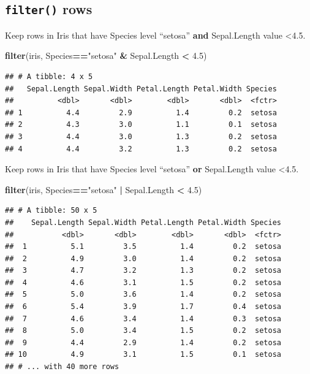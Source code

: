 \documentclass[]{book}
\newenvironment{Shaded}{\begin{snugshade}}{\end{snugshade}}
\newcommand{\KeywordTok}[1]{\textcolor[rgb]{0.13,0.29,0.53}{\textbf{#1}}}
\newcommand{\FloatTok}[1]{\textcolor[rgb]{0.00,0.00,0.81}{#1}}
\newcommand{\StringTok}[1]{\textcolor[rgb]{0.31,0.60,0.02}{#1}}
\newcommand{\OperatorTok}[1]{\textcolor[rgb]{0.81,0.36,0.00}{\textbf{#1}}}
\newcommand{\NormalTok}[1]{#1}
\begin{document}
\subsection{\texorpdfstring{\texttt{filter()}
rows}{filter() rows}}\label{filter-rows}

Keep rows in Iris that have Species level ``setosa'' \textbf{and}
Sepal.Length value \textless{}4.5.

\begin{Shaded}
\begin{Highlighting}[]
\KeywordTok{filter}\NormalTok{(iris, Species}\OperatorTok{==}\StringTok{"setosa"} \OperatorTok{&}\StringTok{ }\NormalTok{Sepal.Length }\OperatorTok{<}\StringTok{ }\FloatTok{4.5}\NormalTok{)}
\end{Highlighting}
\end{Shaded}

\begin{verbatim}
## # A tibble: 4 x 5
##   Sepal.Length Sepal.Width Petal.Length Petal.Width Species
##          <dbl>       <dbl>        <dbl>       <dbl>  <fctr>
## 1          4.4         2.9          1.4         0.2  setosa
## 2          4.3         3.0          1.1         0.1  setosa
## 3          4.4         3.0          1.3         0.2  setosa
## 4          4.4         3.2          1.3         0.2  setosa
\end{verbatim}

Keep rows in Iris that have Species level ``setosa'' \textbf{or}
Sepal.Length value \textless{}4.5.

\begin{Shaded}
\begin{Highlighting}[]
\KeywordTok{filter}\NormalTok{(iris, Species}\OperatorTok{==}\StringTok{"setosa"} \OperatorTok{|}\StringTok{ }\NormalTok{Sepal.Length }\OperatorTok{<}\StringTok{ }\FloatTok{4.5}\NormalTok{)}
\end{Highlighting}
\end{Shaded}

\begin{verbatim}
## # A tibble: 50 x 5
##    Sepal.Length Sepal.Width Petal.Length Petal.Width Species
##           <dbl>       <dbl>        <dbl>       <dbl>  <fctr>
##  1          5.1         3.5          1.4         0.2  setosa
##  2          4.9         3.0          1.4         0.2  setosa
##  3          4.7         3.2          1.3         0.2  setosa
##  4          4.6         3.1          1.5         0.2  setosa
##  5          5.0         3.6          1.4         0.2  setosa
##  6          5.4         3.9          1.7         0.4  setosa
##  7          4.6         3.4          1.4         0.3  setosa
##  8          5.0         3.4          1.5         0.2  setosa
##  9          4.4         2.9          1.4         0.2  setosa
## 10          4.9         3.1          1.5         0.1  setosa
## # ... with 40 more rows
\end{verbatim}
\end{document}
